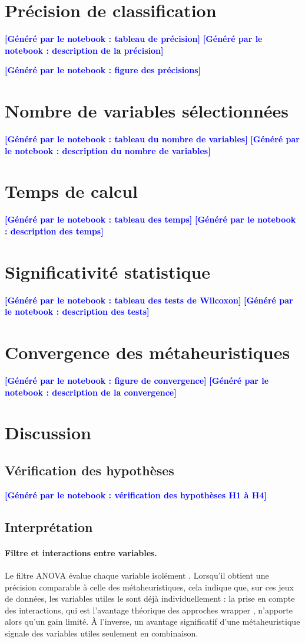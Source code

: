 \documentclass[11pt,a4paper]{report}
\newcommand{\attente}[1]{\textcolor{blue}{\textbf{[Généré par le notebook : #1]}}}
\newcommand{\TabAcc}{\attente{tableau de précision}}
\newcommand{\TabNvar}{\attente{tableau du nombre de variables}}
\newcommand{\TabTemps}{\attente{tableau des temps}}
\newcommand{\TabWilcoxon}{\attente{tableau des tests de Wilcoxon}}
\newcommand{\FigConvergence}{\attente{figure de convergence}}
\newcommand{\FigBoxplot}{\attente{figure des précisions}}
\newcommand{\ResPrecision}{\attente{description de la précision}}
\newcommand{\ResVariables}{\attente{description du nombre de variables}}
\newcommand{\ResTemps}{\attente{description des temps}}
\newcommand{\ResSignif}{\attente{description des tests}}
\newcommand{\ResConvergence}{\attente{description de la convergence}}
\newcommand{\DiscHypotheses}{\attente{vérification des hypothèses H1 à H4}}
\begin{document}

\section{Précision de classification}
\TabAcc
\ResPrecision

\FigBoxplot

\section{Nombre de variables sélectionnées}
\TabNvar
\ResVariables

\section{Temps de calcul}
\TabTemps
\ResTemps

\section{Significativité statistique}
\TabWilcoxon
\ResSignif

\section{Convergence des métaheuristiques}
\FigConvergence
\ResConvergence

\section{Discussion}
\subsection{Vérification des hypothèses}
\DiscHypotheses

\subsection{Interprétation}
\paragraph{Filtre et interactions entre variables.}
Le filtre ANOVA évalue chaque variable isolément \cite{guyon2003}. Lorsqu'il obtient une
précision comparable à celle des métaheuristiques, cela indique que, sur ces jeux de données,
les variables utiles le sont déjà individuellement : la prise en compte des interactions, qui est
l'avantage théorique des approches wrapper \cite{kohavi1997,xue2016}, n'apporte alors qu'un gain
limité. À l'inverse, un avantage significatif d'une métaheuristique signale des variables utiles
seulement en combinaison.
\end{document}
